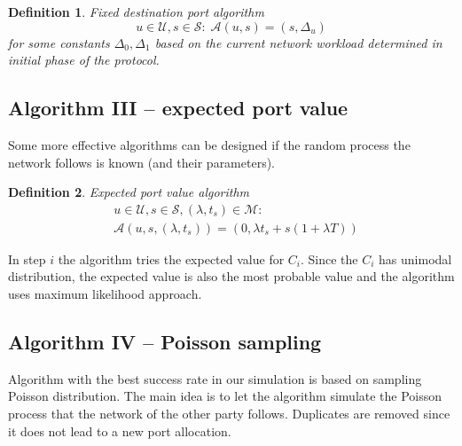 \documentclass{acm_proc_article-sp}
\newtheorem{mydef}{Definition}
\begin{document}
\begin{mydef}
Fixed destination port algorithm
\[
u \in \mathcal{U}, s \in \mathcal{S}: \;
\mathcal{A}(u, s) = (s, \Delta_u)
\] for some constants $\Delta_0, \Delta_1$ based on the current network workload determined in initial phase of the protocol.
\end{mydef}

\subsection{Algorithm III -- expected port value}
Some more effective algorithms can be designed if the random process the network follows is known (and their
parameters).

\begin{mydef}
Expected port value algorithm
\begin{align*}
& u \in \mathcal{U}, s \in \mathcal{S}, (\lambda, t_s) \in \mathcal{M}:\\
& \mathcal{A}(u, s, (\lambda, t_s)) = (0, \lambda t_s + s(1 + \lambda T))
\end{align*}
\end{mydef}

In step $i$ the algorithm tries the expected value for $C_i$. Since the $C_i$ has unimodal distribution,
the expected value is also the most probable value and the algorithm uses maximum likelihood approach.
\subsection{Algorithm IV -- Poisson sampling}
Algorithm with the best success rate in our simulation is based on sampling Poisson distribution.
The main idea is to let the algorithm simulate the Poisson process that the network of the
other party follows. Duplicates are removed since it does not lead to a new port allocation.
\end{document}
